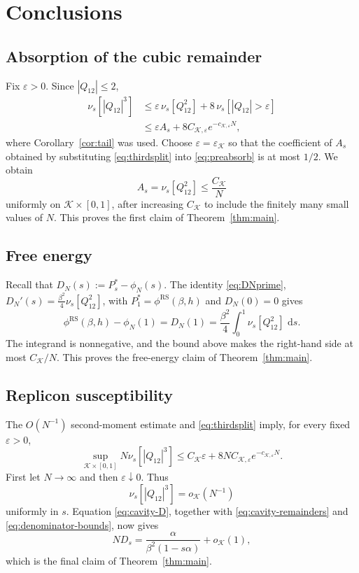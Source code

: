 \documentclass[11pt]{article}
\numberwithin{equation}{section}
\newcommand{\1}{\mathbf 1}
\newcommand{\cK}{\mathcal K}
\newcommand{\dd}{\,\mathrm d}
\begin{document}
\section{Conclusions}\label{sec:conclusion}
\subsection{Absorption of the cubic remainder}\label{subsec:absorb}

Fix $\varepsilon>0$.  Since $|Q_{12}|\le2$,
\begin{align}
 \nu_s[|Q_{12}|^3]
 &\le
 \varepsilon\,\nu_s[Q_{12}^2]
 +8\,\nu_s[|Q_{12}|>\varepsilon]\nonumber\\
 &\le
 \varepsilon A_s
 +8C_{\cK,\varepsilon}e^{-c_{\cK,\varepsilon}N},
 \label{eq:thirdsplit}
\end{align}
where Corollary~\ref{cor:tail} was used.  Choose
$\varepsilon=\varepsilon_{\cK}$
so that the coefficient of $A_s$ obtained by substituting
\eqref{eq:thirdsplit} into \eqref{eq:preabsorb} is at most $1/2$.
We obtain
\[
 A_s=\nu_s[Q_{12}^2] \le\frac{C_{\cK}}N
\]
uniformly on $\cK\times[0,1]$, after increasing $C_{\cK}$ to include
the finitely many small values of $N$.  This proves the first claim
of Theorem~\ref{thm:main}.

\subsection{Free energy}\label{subsec:freeenergy}

Recall that $D_N(s):= P_s^* -\phi_N(s)$. The identity \eqref{eq:DNprime}, $D_N'(s) = \frac{\beta^2}{4}\nu_s[Q_{12}^2]$, with $P_1^*  =  \phi^{\mathrm{RS}}(\beta,h)$ and  $D_N(0)=0$ gives
\begin{equation}
 \phi^{\mathrm{RS}}(\beta,h)-\phi_N(1)
 =D_N(1)=
 \frac{\beta^2}{4}\int_0^1\nu_s[Q_{12}^2]\,\dd s.
 \label{eq:freeenergyidentity}
\end{equation}
The integrand is nonnegative, and the  
bound above makes the right-hand side at most $C_{\cK}/N$.  This proves the
free-energy claim of Theorem~\ref{thm:main}.

\subsection{Replicon susceptibility}\label{subsec:susceptibility}

The $O(N^{-1})$ second-moment estimate and
\eqref{eq:thirdsplit} imply, for every fixed $\varepsilon>0$,
\[
 \sup_{\cK\times[0,1]}
 N\nu_s[|Q_{12}|^3]
 \le C_{\cK}\varepsilon
 +8N C_{\cK,\varepsilon}e^{-c_{\cK,\varepsilon}N}.
\]
First let $N\to\infty$ and then $\varepsilon\downarrow0$.  Thus
\[
 \nu_s[|Q_{12}|^3]=o_{\cK}(N^{-1})
\]
uniformly in $s$.  Equation \eqref{eq:cavity-D}, together with
\eqref{eq:cavity-remainders} and \eqref{eq:denominator-bounds}, now gives
\[
 ND_s
 =
 \frac{\alpha}{\beta^2(1-s\alpha)}+o_{\cK}(1),
\]
which is the final claim of Theorem~\ref{thm:main}.
\end{document}
